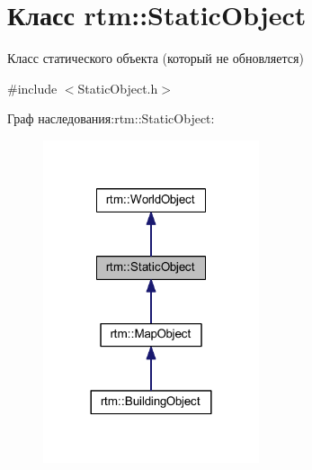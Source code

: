 \hypertarget{classrtm_1_1_static_object}{}\section{Класс rtm\+:\+:Static\+Object}
\label{classrtm_1_1_static_object}


Класс статического объекта (который не обновляется)  




{\ttfamily \#include $<$Static\+Object.\+h$>$}



Граф наследования\+:rtm\+:\+:Static\+Object\+:
\nopagebreak
\begin{figure}[H]
\begin{center}
\leavevmode
\includegraphics[width=180pt]{classrtm_1_1_static_object__inherit__graph}
\end{center}
\end{figure}
